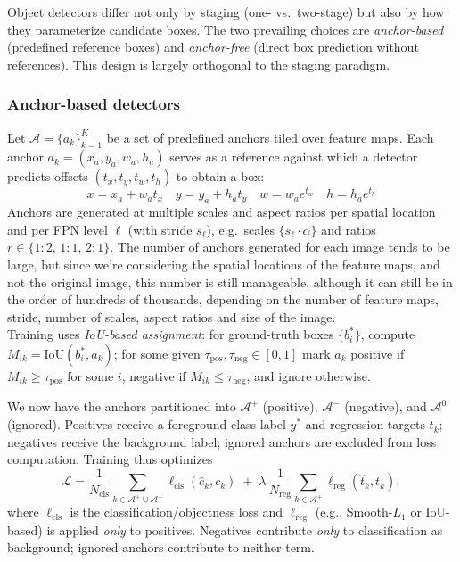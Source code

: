 Object detectors differ not only by staging (one- vs.\ two-stage) but also by how they parameterize candidate boxes. The two prevailing choices are \emph{anchor-based} (predefined reference boxes) and \emph{anchor-free} (direct box prediction without references). This design is largely orthogonal to the staging paradigm.

\subsubsection{Anchor-based detectors}
Let $\mathcal{A}=\{a_k\}_{k=1}^{K}$ be a set of predefined anchors tiled over feature maps. 
Each anchor $a_k=(x_a,y_a,w_a,h_a)$ serves as a reference against which a detector predicts offsets $(t_x,t_y,t_w,t_h)$ to obtain a box:
$$
x = x_a + w_a t_x \quad
y = y_a + h_a t_y \quad
w = w_a e^{t_w} \quad
h = h_a e^{t_h}
$$
Anchors are generated at multiple scales and aspect ratios per spatial location and per FPN level $\ell$ (with stride $s_\ell$), e.g.\ scales $\{s_\ell \cdot \alpha\}$ and ratios $r \in \{1\!:\!2,\,1\!:\!1,\,2\!:\!1\}$.
The number of anchors generated for each image tends to be large, but since we're considering the spatial locations of the feature maps, and not the original image, this number is still manageable, although it can still be in the order of hundreds of thousands, depending on the number of feature maps, stride, number of scales, aspect ratios and size of the image.\\

Training uses \emph{IoU-based assignment}: for ground-truth boxes $\{b_i^\ast\}$, compute $M_{ik}=\mathrm{IoU}(b_i^\ast,a_k)$; for some given $\tau_{\text{pos}}, \tau_{\text{neg}} \in [0, 1]$ mark $a_k$ positive if $M_{ik}\ge \tau_{\text{pos}}$ for some $i$, negative if $M_{ik}\le \tau_{\text{neg}}$, and ignore otherwise. 

We now have the anchors partitioned into $\mathcal{A}^+$ (positive), $\mathcal{A}^-$ (negative), and $\mathcal{A}^0$ (ignored).
Positives receive a foreground class label $y^\ast$ and regression targets $t_k$; negatives receive the background label; ignored anchors are excluded from loss computation.
Training thus optimizes
$$
\mathcal{L}
= \frac{1}{N_{\text{cls}}}\sum_{k \in \mathcal{A}^+ \cup \mathcal{A}^-} \ell_{\text{cls}}(\hat{c}_k, c_k)
\;+\;
\lambda\,\frac{1}{N_{\text{reg}}}\sum_{k \in \mathcal{A}^+} \ell_{\text{reg}}(\hat{t}_k, t_k),
$$
where $\ell_{\text{cls}}$ is the classification/objectness loss and $\ell_{\text{reg}}$ (e.g., Smooth-$L_1$ or IoU-based) is applied \emph{only} to positives.
Negatives contribute \emph{only} to classification as background; ignored anchors contribute to neither term.

